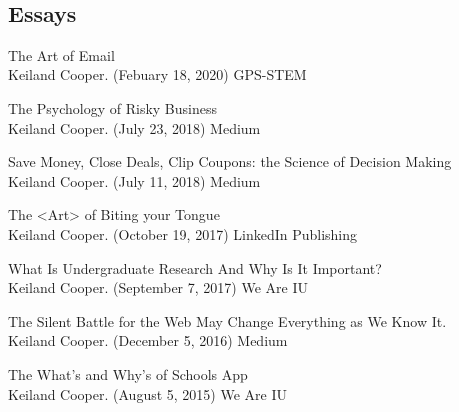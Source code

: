 \documentclass[10pt]{cooperCV2}
\begin{document}

\needspace{\headerpush}
\myRule{\columnwidth}{1pt}\\

 
\subsection{Essays} 
\begin{etaremune}[itemindent=-1.5\bibhang, topsep=0pt,
				   itemsep=\bibsep,partopsep=0pt,parsep=0pt,leftmargin={\bibhang+\widthof{[999]}}] 
    
    \item The Art of Email \\
     Keiland Cooper. (Febuary 18, 2020) GPS-STEM
     
	
    \item The Psychology of Risky Business \\
     Keiland Cooper. (July 23, 2018) Medium
     
	
    \item Save Money, Close Deals, Clip Coupons: the Science of Decision Making \\
     Keiland Cooper. (July 11, 2018) Medium
     
	
    \item The <Art> of Biting your Tongue \\
     Keiland Cooper. (October 19, 2017) LinkedIn Publishing
     
	
    \item What Is Undergraduate Research And Why Is It Important? \\
     Keiland Cooper. (September 7, 2017) We Are IU
     
	
    \item The Silent Battle for the Web May Change Everything as We Know It. \\
     Keiland Cooper. (December 5, 2016) Medium
     
	
    \item The What’s and Why’s of Schools App \\
     Keiland Cooper. (August 5, 2015) We Are IU
     
	

\end{etaremune}
\end{document}
